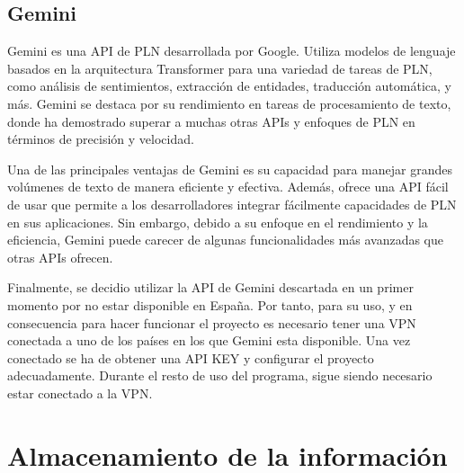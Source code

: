 \subsection{Gemini}


Gemini es una API de PLN desarrollada por Google. Utiliza modelos de lenguaje basados en la arquitectura Transformer para una variedad de tareas de PLN, como análisis de sentimientos, extracción de entidades, traducción automática, y más. Gemini se destaca por su rendimiento en tareas de procesamiento de texto, donde ha demostrado superar a muchas otras APIs y enfoques de PLN en términos de precisión y velocidad.

Una de las principales ventajas de Gemini es su capacidad para manejar grandes volúmenes de texto de manera eficiente y efectiva. Además, ofrece una API fácil de usar que permite a los desarrolladores integrar fácilmente capacidades de PLN en sus aplicaciones. Sin embargo, debido a su enfoque en el rendimiento y la eficiencia, Gemini puede carecer de algunas funcionalidades más avanzadas que otras APIs ofrecen.

Finalmente, se decidio utilizar la API de Gemini descartada en un primer momento por no estar disponible en España. Por tanto, para su uso, y en consecuencia para hacer funcionar el proyecto es necesario tener una VPN conectada a uno de los países en los que Gemini esta disponible. Una vez conectado se ha de obtener una API KEY y configurar el proyecto adecuadamente. Durante el resto de uso del programa, sigue siendo necesario estar conectado a la VPN.







\section{Almacenamiento de la información}	
